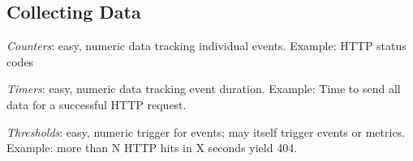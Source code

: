 \documentclass[xga]{xdvislides}
\begin{document}
\subsection{Collecting Data}
{\em Counters}: easy, numeric data tracking individual events. Example: HTTP status codes

\addvspace{.5in}
{\em Timers}: easy, numeric data tracking event duration. Example: Time to send all
data for a successful HTTP request.

\addvspace{.5in}
{\em Thresholds}: easy, numeric trigger for events; may itself trigger events or metrics.
Example: more than N HTTP hits in X seconds yield 404.

\end{document}
